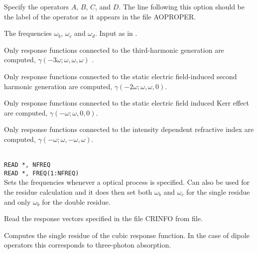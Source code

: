 \begin{description}

\item[, , , ]
Specify the operators $A$, $B$, $C$, and $D$. The line following this
option should be the label of the operator as it appears in the file
AOPROPER.

\item[, , ]
The frequencies $\omega_b$, $\omega_c$ and $\omega_d$. Input as in
.

\item{}
Only response functions connected to the third-harmonic
generation are
computed, $\gamma(-3\omega;\omega,\omega,\omega)$ \cite{djpnylhajcp105}.

\item{}
Only response functions connected to the static electric field-induced
second harmonic generation are computed,
$\gamma(-2\omega;\omega,\omega,0)$.

\item{}
Only response functions connected to the static electric field induced
Kerr effect are computed,
$\gamma(-\omega;\omega,0,0)$.

\item{}
Only response functions connected to the intensity dependent 
refractive index are computed,
$\gamma(-\omega;\omega,-\omega,\omega)$.

\item{}\\
\verb|READ *, NFREQ|\\
\verb|READ *, FREQ(1:NFREQ)|\\
Sets the frequencies whenever a optical process is specified.
Can also be used for the residue calculation and it does then set 
both $\omega_b$ and $\omega_c$ for the single residue and only
$\omega_b$ for the double residue.

\item{}
Read the response vectors specified in the file CRINFO from
file.

\item{}
Computes the single residue of the cubic
response function.
In the case of dipole operators this corresponds to
three-photon absorption.


\end{description}
